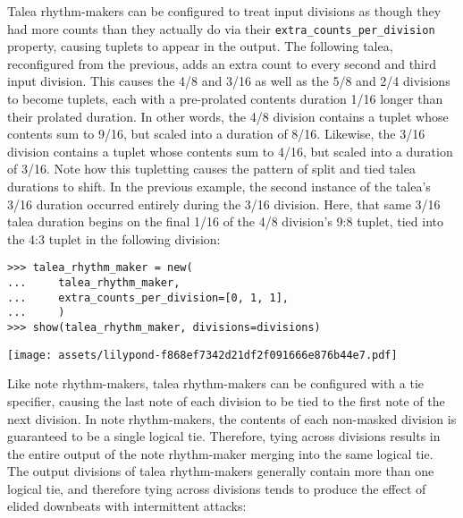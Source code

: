 \noindent Talea rhythm-makers can be configured to treat input divisions as
though they had more counts than they actually do via their
\texttt{extra\_counts\_per\_division} property, causing tuplets to appear in
the output. The following talea, reconfigured from the previous, adds an extra
count to every second and third input division. This causes the 4/8 and 3/16 as
well as the 5/8 and 2/4 divisions to become tuplets, each with a pre-prolated
contents duration 1/16 longer than their prolated duration. In other words, the 4/8
division contains a tuplet whose contents sum to 9/16, but scaled into a
duration of 8/16. Likewise, the 3/16 division contains a tuplet whose contents
sum to 4/16, but scaled into a duration of 3/16. Note how this tupletting
causes the pattern of split and tied talea durations to shift. In the previous
example, the second instance of the talea's 3/16 duration occurred entirely
during the 3/16 division. Here, that same 3/16 talea duration begins on the
final 1/16 of the 4/8 division's 9:8 tuplet, tied into the 4:3 tuplet in the
following division:

\begin{comment}
<abjad>
talea_rhythm_maker = new(
    talea_rhythm_maker,
    extra_counts_per_division=[0, 1, 1],
    )
show(talea_rhythm_maker, divisions=divisions)
</abjad>
\end{comment}

\begin{abjadbookoutput}
\begin{singlespacing}
\vspace{-0.5\baselineskip}
\begin{verbatim}
>>> talea_rhythm_maker = new(
...     talea_rhythm_maker,
...     extra_counts_per_division=[0, 1, 1],
...     )
>>> show(talea_rhythm_maker, divisions=divisions)
\end{verbatim}
\noindent\texttt{[image: assets/lilypond-f868ef7342d21df2f091666e876b44e7.pdf]}
\end{singlespacing}
\end{abjadbookoutput}

\noindent Like note rhythm-makers, talea rhythm-makers can be configured with a
tie specifier, causing the last note of each division to be tied to the first
note of the next division. In note rhythm-makers, the contents of each
non-masked division is guaranteed to be a single logical tie. Therefore, tying
across divisions results in the entire output of the note rhythm-maker merging
into the same logical tie. The output divisions of talea rhythm-makers
generally contain more than one logical tie, and therefore tying across
divisions tends to produce the effect of elided downbeats with intermittent
attacks:

